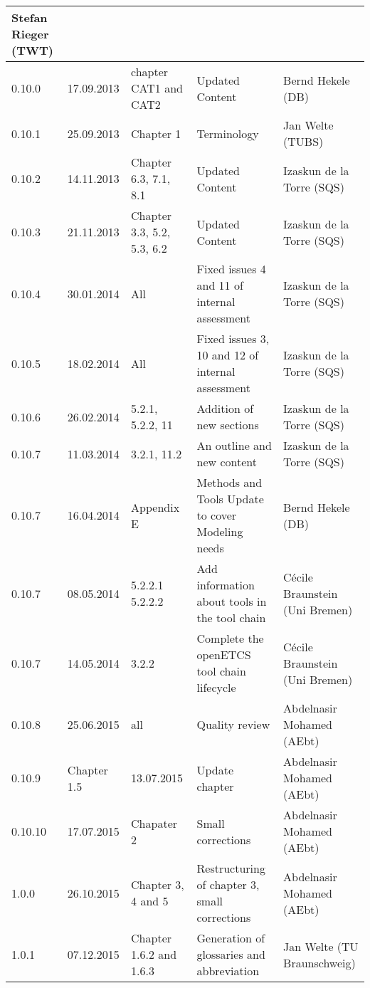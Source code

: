 \documentclass{template/openetcs_article}
\begin{document}
\begin{center}
\begin{longtable}{m{1.1cm}m{1.8cm}m{2cm}m{5cm}m{4cm}}
Stefan Rieger (TWT)\\\hline
0.10.0 &
17.09.2013 &
chapter CAT1 and CAT2 &
Updated Content  &
Bernd Hekele (DB)
\\\hline
0.10.1 &
25.09.2013 &
Chapter 1 &
Terminology &
Jan Welte (TUBS)
\\\hline
0.10.2 &
14.11.2013 &
Chapter 6.3, 7.1, 8.1 &
Updated Content &
Izaskun de la Torre (SQS)
\\\hline
0.10.3 &
21.11.2013 &
Chapter 3.3, 5.2, 5.3, 6.2 &
Updated Content &
Izaskun de la Torre (SQS)
\\\hline
0.10.4 &
30.01.2014 &
All &
Fixed issues 4 and 11 of internal assessment &
Izaskun de la Torre (SQS)
\\\hline
0.10.5 &
18.02.2014 &
All &
Fixed issues 3, 10 and 12 of internal assessment &
Izaskun de la Torre (SQS)
\\\hline
0.10.6 &
26.02.2014 &
5.2.1, 5.2.2, 11 &
Addition of new sections &
Izaskun de la Torre (SQS)
\\\hline
0.10.7 &
11.03.2014 &
3.2.1, 11.2 &
An outline and new content &
Izaskun de la Torre (SQS)
\\\hline
0.10.7 &
16.04.2014 &
Appendix E &
Methods and Tools Update to cover Modeling needs &
Bernd Hekele (DB)
\\\hline
0.10.7 &
08.05.2014 &
5.2.2.1 5.2.2.2 &
Add information about tools in the tool chain &
C\'ecile Braunstein (Uni Bremen)
\\\hline
0.10.7 &
14.05.2014 &
3.2.2 &
Complete the  openETCS tool chain lifecycle &
C\'ecile Braunstein (Uni Bremen)
\\\hline
0.10.8 &
25.06.2015 &
all &
Quality review &
Abdelnasir Mohamed (AEbt)
\\\hline
0.10.9 &
Chapter 1.5 &
13.07.2015 &
Update chapter &
Abdelnasir Mohamed (AEbt)
\\\hline
0.10.10 &
17.07.2015 &
Chapater 2 &
Small corrections &
Abdelnasir Mohamed (AEbt)
\\\hline
1.0.0 &
26.10.2015 &
Chapter 3, 4 and 5&
Restructuring of chapter 3, small corrections &
Abdelnasir Mohamed (AEbt)
\\\hline
1.0.1 &
07.12.2015 &
Chapter 1.6.2 and 1.6.3 &
Generation of glossaries and abbreviation &
Jan Welte (TU Braunschweig)


\end{longtable}
\end{center}


\newpage
\end{document}
